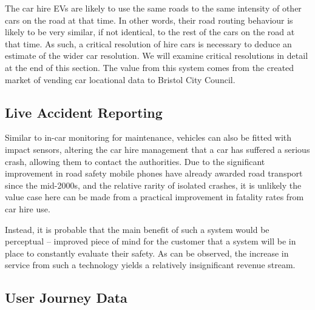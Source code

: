 \documentclass[conference]{IEEEtran}
\begin{document}
The car hire EVs are likely to use the same roads to the same
intensity of other cars on the road at that time. In other words,
their road routing behaviour is likely to be very similar, if not
identical, to the rest of the cars on the road at that time. As such,
a critical resolution of hire cars is necessary to deduce an estimate
of the wider car resolution. We will examine critical resolutions in
detail at the end of this section.  The value from this system comes
from the created market of vending car locational data to Bristol City
Council.


\subsection{Live Accident Reporting}

Similar to in-car monitoring for maintenance, vehicles can also be
fitted with impact sensors, altering the car hire management that a
car has suffered a serious crash, allowing them to contact the
authorities.  Due to the significant improvement in road safety mobile
phones have already awarded road transport since the mid-2000s, and
the relative rarity of isolated crashes, it is unlikely the value case
here can be made from a practical improvement in fatality rates from
car hire use.

Instead, it is probable that the main benefit of such a system would
be perceptual – improved piece of mind for the customer that a system
will be in place to constantly evaluate their safety.  As can be
observed, the increase in service from such a technology yields a
relatively insignificant revenue stream.



\subsection{User Journey Data}
\end{document}
